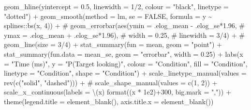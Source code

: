 \documentclass[
  letterpaper,
  DIV=11,
  numbers=noendperiod]{scrartcl}
\newenvironment{Shaded}{\begin{snugshade}}{\end{snugshade}}
\newcommand{\AttributeTok}[1]{\textcolor[rgb]{0.40,0.45,0.13}{#1}}
\newcommand{\CommentTok}[1]{\textcolor[rgb]{0.37,0.37,0.37}{#1}}
\newcommand{\ConstantTok}[1]{\textcolor[rgb]{0.56,0.35,0.01}{#1}}
\newcommand{\DecValTok}[1]{\textcolor[rgb]{0.68,0.00,0.00}{#1}}
\newcommand{\FloatTok}[1]{\textcolor[rgb]{0.68,0.00,0.00}{#1}}
\newcommand{\FunctionTok}[1]{\textcolor[rgb]{0.28,0.35,0.67}{#1}}
\newcommand{\NormalTok}[1]{\textcolor[rgb]{0.00,0.23,0.31}{#1}}
\newcommand{\SpecialCharTok}[1]{\textcolor[rgb]{0.37,0.37,0.37}{#1}}
\newcommand{\StringTok}[1]{\textcolor[rgb]{0.13,0.47,0.30}{#1}}
\begin{document}
\begin{Shaded}
\begin{Highlighting}[]
    \FunctionTok{geom\_hline}\NormalTok{(}\AttributeTok{yintercept =} \FloatTok{0.5}\NormalTok{, }
               \AttributeTok{linewidth =} \DecValTok{1}\SpecialCharTok{/}\DecValTok{2}\NormalTok{,}
               \AttributeTok{colour =} \StringTok{"black"}\NormalTok{,}
               \AttributeTok{linetype =} \StringTok{"dotted"}\NormalTok{) }\SpecialCharTok{+}
    \FunctionTok{geom\_smooth}\NormalTok{(}\AttributeTok{method =}\NormalTok{ lm, }
                \AttributeTok{se =} \ConstantTok{FALSE}\NormalTok{, }
                \AttributeTok{formula =}\NormalTok{ y }\SpecialCharTok{\textasciitilde{}}\NormalTok{ splines}\SpecialCharTok{::}\FunctionTok{bs}\NormalTok{(x, }\DecValTok{4}\NormalTok{)) }\SpecialCharTok{+}
    \CommentTok{\# geom\_errorbar(aes(ymin = .elog\_mean {-} .elog\_se*1.96, }
    \CommentTok{\#                 ymax = .elog\_mean + .elog\_se*1.96),}
    \CommentTok{\#             width = 0.25,}
    \CommentTok{\#             linewidth = 3/4) + }
    \CommentTok{\# geom\_line(size = 3/4) + }
    \FunctionTok{stat\_summary}\NormalTok{(}\AttributeTok{fun =}\NormalTok{ mean, }\AttributeTok{geom =} \StringTok{"point"}\NormalTok{) }\SpecialCharTok{+}
    \FunctionTok{stat\_summary}\NormalTok{(}\AttributeTok{fun.data =}\NormalTok{ mean\_se,}
                 \AttributeTok{geom =} \StringTok{"errorbar"}\NormalTok{,}
                 \AttributeTok{width =} \FloatTok{0.25}\NormalTok{) }\SpecialCharTok{+}
    \FunctionTok{labs}\NormalTok{(}\AttributeTok{x =} \StringTok{"Time (ms)"}\NormalTok{,}
         \AttributeTok{y =} \StringTok{"P(Target looking)"}\NormalTok{,}
         \AttributeTok{colour =} \StringTok{"Condition"}\NormalTok{,}
         \AttributeTok{fill =} \StringTok{"Condition"}\NormalTok{,}
         \AttributeTok{linetype =} \StringTok{"Condition"}\NormalTok{,}
         \AttributeTok{shape =} \StringTok{"Condition"}\NormalTok{) }\SpecialCharTok{+}
    \FunctionTok{scale\_linetype\_manual}\NormalTok{(}\AttributeTok{values =} \FunctionTok{rev}\NormalTok{(}\FunctionTok{c}\NormalTok{(}\StringTok{"solid"}\NormalTok{, }\StringTok{"dashed"}\NormalTok{))) }\SpecialCharTok{+}
    \CommentTok{\# scale\_shape\_manual(values = c(1, 2)) +}
    \FunctionTok{scale\_x\_continuous}\NormalTok{(}\AttributeTok{labels =}\NormalTok{ \textbackslash{}(x) }\FunctionTok{format}\NormalTok{((x }\SpecialCharTok{*} \FloatTok{1e2}\NormalTok{)}\SpecialCharTok{+}\DecValTok{300}\NormalTok{, }
                                            \AttributeTok{big.mark =} \StringTok{","}\NormalTok{)) }\SpecialCharTok{+}
    \FunctionTok{theme}\NormalTok{(}\AttributeTok{legend.title =} \FunctionTok{element\_blank}\NormalTok{(),}
          \AttributeTok{axis.title.x =} \FunctionTok{element\_blank}\NormalTok{()) }
\end{Highlighting}
\end{Shaded}
\end{document}
